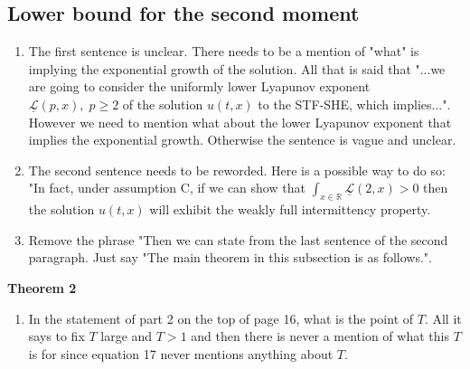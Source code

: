 \documentclass[a4paper,11pt]{article}
\numberwithin{equation}{section}
\numberwithin{equation}{section}
\theoremstyle{plain}
\theoremstyle{definition}
\newcommand{\R}{\mathbb{R}}
\begin{document}
\subsection{Lower bound for the second moment}
\begin{enumerate}
	\item 
The first sentence is unclear. There needs to be a mention of "what" is implying the exponential growth of the solution. All that is said that "...we are going to consider the uniformly lower Lyapunov exponent $\underline{\mathcal{L}}(p,x), \; p \ge 2$ of the solution $u(t,x)$ to the STF-SHE, which implies...". However we need to mention what about the lower Lyapunov exponent that implies the exponential growth. Otherwise the sentence is vague and unclear.
	
	\item 
The second sentence needs to be reworded. Here is a possible way to do so: "In fact, under assumption C, if we can show that $\int_{x \in \R}\underline{\mathcal{L}}(2,x) >0$ then the solution $u(t,x)$ will exhibit the weakly full intermittency property. 

	\item
Remove the phrase "Then we can state from the last sentence of the second paragraph. Just say "The main theorem in this subsection is as follows.".
\end{enumerate}

\textbf{Theorem 2}
\begin{enumerate}
	\item 
In the statement of part 2 on the top of page 16, what is the point of $T$. All it says to fix $T$ large and $T>1$ and then there is never a mention of what this $T$ is for since equation 17 never mentions anything about $T$.
\end{enumerate}
\end{document}
